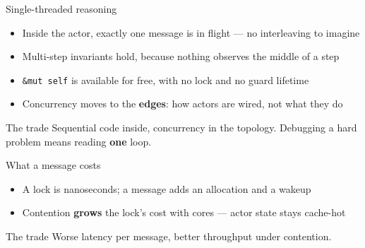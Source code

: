 \begin{frame}{Single-threaded reasoning}
  \begin{itemize}
    \item Inside the actor, exactly one message is in flight --- no interleaving to imagine
    \item Multi-step invariants hold, because nothing observes the middle of a step
    \item \texttt{\&mut self} is available for free, with no lock and no guard lifetime
    \item Concurrency moves to the \textbf{edges}: how actors are wired, not what they do
  \end{itemize}
  \vspace{0.2cm}
  \begin{block}{The trade}
    Sequential code inside, concurrency in the topology. Debugging a hard problem
    means reading \textbf{one} loop.
  \end{block}
\end{frame}

\begin{frame}{What a message costs}
  \begin{itemize}
    \item A lock is nanoseconds; a message adds an allocation and a wakeup
    \item Contention \textbf{grows} the lock's cost with cores --- actor state stays cache-hot
  \end{itemize}
  \vspace{-0.3cm}
  \begin{center}
  \end{center}
  \begin{block}{The trade}
    Worse latency per message, better throughput under contention.
  \end{block}
\end{frame}

